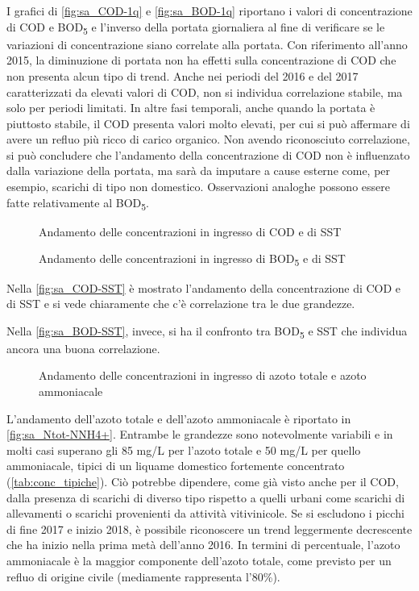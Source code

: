 I grafici di \autoref{fig:sa_COD-1q} e \autoref{fig:sa_BOD-1q} riportano i valori di concentrazione di COD e BOD\textsubscript{5} e l’inverso della portata giornaliera al fine di verificare se le variazioni di concentrazione siano correlate alla portata.
Con riferimento all’anno 2015, la diminuzione di portata non ha effetti sulla concentrazione di COD che non presenta alcun tipo di trend. Anche nei periodi del 2016 e del 2017 caratterizzati da elevati valori di COD, non si individua correlazione stabile, ma solo per periodi limitati. In altre fasi temporali, anche quando la portata è piuttosto stabile, il COD presenta valori molto elevati, per cui si può affermare di avere un refluo più ricco di carico organico.
Non avendo riconosciuto correlazione, si può concludere che l’andamento della concentrazione di COD non è influenzato dalla variazione della portata, ma sarà da imputare a cause esterne come, per esempio, scarichi di tipo non domestico.
Osservazioni analoghe possono essere fatte relativamente al BOD\textsubscript{5}.

\begin{figure}[H]
	\centering
	\caption{Andamento delle concentrazioni in ingresso di COD e di SST}
	\label{fig:sa_COD-SST}
\end{figure}
\begin{figure}[H]
	\centering
	\caption{Andamento delle concentrazioni in ingresso di BOD\textsubscript{5} e di SST}
	\label{fig:sa_BOD-SST}
\end{figure}

Nella \autoref{fig:sa_COD-SST} è mostrato l’andamento della concentrazione di COD e di SST e si vede chiaramente che c’è correlazione tra le due grandezze.

Nella \autoref{fig:sa_BOD-SST}, invece, si ha il confronto tra BOD\textsubscript{5} e SST che individua ancora una buona correlazione.

\begin{figure}[H]
	\centering
	\caption{Andamento delle concentrazioni in ingresso di azoto totale e azoto ammoniacale}
	\label{fig:sa_Ntot-NNH4+}
\end{figure}

L’andamento dell’azoto totale e dell’azoto ammoniacale è riportato in \autoref{fig:sa_Ntot-NNH4+}.
Entrambe le grandezze sono notevolmente variabili e in molti casi superano gli 85 mg/L per l’azoto totale e 50 mg/L per quello ammoniacale, tipici di un liquame domestico fortemente concentrato (\autoref{tab:conc_tipiche}). Ciò potrebbe dipendere, come già visto anche per il COD, dalla presenza di scarichi di diverso tipo rispetto a quelli urbani come scarichi di allevamenti o scarichi provenienti da attività vitivinicole.
Se si escludono i picchi di fine 2017 e inizio 2018, è possibile riconoscere un trend leggermente decrescente che ha inizio nella prima metà dell’anno 2016. 
In termini di percentuale, l’azoto ammoniacale è la maggior componente dell’azoto totale, come previsto per un refluo di origine civile (mediamente rappresenta l'80\%).

